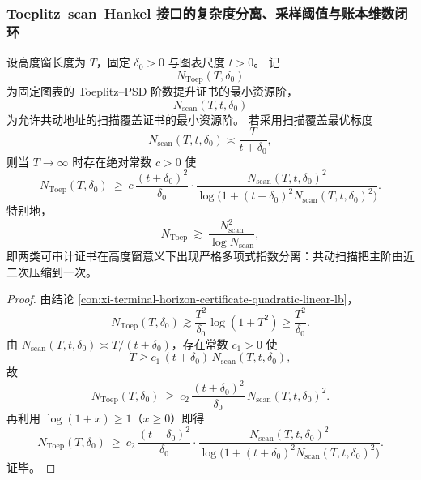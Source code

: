 \subsubsection{Toeplitz--scan--Hankel 接口的复杂度分离、采样阈值与账本维数闭环}\label{subsubsec:xi-time-protocol-conclusions-part45}

\begin{conclusion}\label{con:xi-toeplitz-psd-vs-comoving-scan-strict-separation}
设高度窗长度为 \(T\)，固定 \(\delta_0>0\) 与图表尺度 \(t>0\)。
记
\[
N_{\mathrm{Toep}}(T,\delta_0)
\]
为固定图表的 Toeplitz--PSD 阶数提升证书的最小资源阶，
\[
N_{\mathrm{scan}}(T,t,\delta_0)
\]
为允许共动地址的扫描覆盖证书的最小资源阶。
若采用扫描覆盖最优标度
\[
N_{\mathrm{scan}}(T,t,\delta_0)\asymp \frac{T}{t+\delta_0},
\]
则当 \(T\to\infty\) 时存在绝对常数 \(c>0\) 使
\[
N_{\mathrm{Toep}}(T,\delta_0)\ \ge\
c\,\frac{(t+\delta_0)^2}{\delta_0}\cdot
\frac{N_{\mathrm{scan}}(T,t,\delta_0)^2}
{\log\!\bigl(1+(t+\delta_0)^2N_{\mathrm{scan}}(T,t,\delta_0)^2\bigr)}.
\]
特别地，
\[
N_{\mathrm{Toep}}\ \gtrsim\ \frac{N_{\mathrm{scan}}^2}{\log N_{\mathrm{scan}}},
\]
即两类可审计证书在高度窗意义下出现严格多项式指数分离：共动扫描把主阶由近二次压缩到一次。
\end{conclusion}
\begin{proof}
由结论 \ref{con:xi-terminal-horizon-certificate-quadratic-linear-lb}，
\[
N_{\mathrm{Toep}}(T,\delta_0)\gtrsim \frac{T^2}{\delta_0}\log(1+T^2)\ge \frac{T^2}{\delta_0}.
\]
由 \(N_{\mathrm{scan}}(T,t,\delta_0)\asymp T/(t+\delta_0)\)，存在常数 \(c_1>0\) 使
\[
T\ge c_1\,(t+\delta_0)\,N_{\mathrm{scan}}(T,t,\delta_0),
\]
故
\[
N_{\mathrm{Toep}}(T,\delta_0)\ \ge\
c_2\,\frac{(t+\delta_0)^2}{\delta_0}\,N_{\mathrm{scan}}(T,t,\delta_0)^2.
\]
再利用 \(\log(1+x)\ge 1\)（\(x\ge 0\)）即得
\[
N_{\mathrm{Toep}}(T,\delta_0)\ \ge\
c_2\,\frac{(t+\delta_0)^2}{\delta_0}\cdot
\frac{N_{\mathrm{scan}}(T,t,\delta_0)^2}
{\log\!\bigl(1+(t+\delta_0)^2N_{\mathrm{scan}}(T,t,\delta_0)^2\bigr)}.
\]
证毕。
\end{proof}

